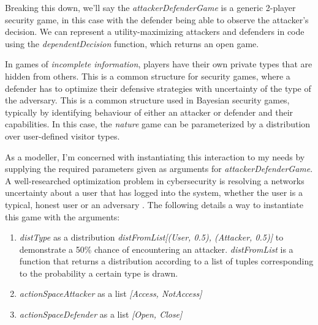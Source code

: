 \begin{hscode}
	\>[B]{}\<[4]%
	\>[4]{}\mathbin{:};{}\<[E]%
	\\
	\>[B]{}\<[4]%
	\>[4]{}\mathbin{:};{}\<[E]%
	\\[\blanklineskip]%
	\>[B]{}\<[4]%
	\>[4]{}\mathbin{:----------------------------:}{}\<[E]%
	\\[\blanklineskip]%
	\>[B]{}\<[4]%
	\>[4]{}\mathbin{:},,;{}\<[E]%
	\\
	\>[B]{}\<[4]%
	\>[4]{}\mathbin{:},;{}\<[E]%
	\\[\blanklineskip]%
	\>[B]{}\mid \mskip1.5mu]{}\<[E]%
	\ColumnHook
\end{hscode}\resethooks

Breaking this down, we'll say the \textit{attackerDefenderGame} is a generic 2-player security game, in this case with the defender being able to observe the attacker's decision. We can represent a utility-maximizing attackers and defenders in code using the \textit{dependentDecision} function, which returns an open game. 

In games of \textit{incomplete information}, players have their own private types that are hidden from others. This is a common structure for security games, where a defender has to optimize their defensive strategies with uncertainty of the type of the adversary. This is a common structure used in Bayesian security games, typically by identifying behaviour of either an attacker or defender and their capabilities. In this case, the \textit{nature} game can be parameterized by a distribution over user-defined visitor types.  

As a modeller, I'm concerned with instantiating this interaction to my needs by supplying the required parameters given as arguments for \textit{attackerDefenderGame}. A well-researched optimization problem in cybersecurity is resolving a networks uncertainty about a user that has logged into the system, whether the user is a typical, honest user or an adversary \cite{}. The following details a way to instantiate this game with the arguments: 

\begin{enumerate}
	\item  \textit{distType} as a distribution \textit{distFromList[(User, 0.5), (Attacker, 0.5)]} to demonstrate a 50\% chance of encountering an attacker. \textit{distFromList} is a function that returns a distribution according to a list of tuples corresponding to the probability a certain type is drawn. 
	\item  \textit{actionSpaceAttacker} as a list \textit{[Access, NotAccess]} 
	\item \textit{actionSpaceDefender} as a list \textit{[Open, Close]}
\end{enumerate}

